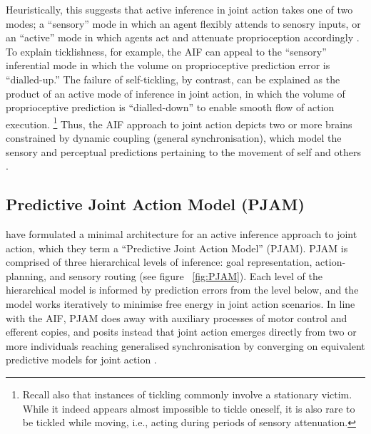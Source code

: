 \begin{CJK}{UTF8}{gbsn}
Heuristically, this suggests that active inference in joint action takes one of two modes; a ``sensory'' mode in which an agent flexibly attends to senosry inputs, or an ``active'' mode in which agents act and attenuate proprioception accordingly \citep{Friston2015}. To explain ticklishness, for example, the AIF can appeal to the ``sensory'' inferential mode in which the volume on proprioceptive prediction error is ``dialled-up.''  The failure of self-tickling, by contrast, can be explained as the product of an active mode of inference in joint action, in which the volume of proprioceptive prediction is ``dialled-down'' to enable smooth flow of action execution.
  \footnote{Recall also that instances of tickling commonly involve a stationary victim. While it indeed appears almost impossible to tickle oneself, it is also rare to be tickled while moving, i.e., acting during periods of sensory attenuation.}
Thus, the AIF approach to joint action depicts two or more brains constrained by dynamic coupling (general synchronisation), which model the sensory and perceptual predictions pertaining to the movement of self and others \citep{Pesquita2017}.


\subsection{Predictive Joint Action Model (PJAM)\label{sect:PJAM}}
 \textcite{Pesquita2017} have formulated a minimal architecture for an active inference approach to joint action, which they term a ``Predictive Joint Action Model'' (PJAM).  PJAM is comprised of three hierarchical levels of inference: goal representation, action-planning, and sensory routing (see figure ~\ref{fig:PJAM}).  Each level of the hierarchical model is informed by prediction errors from the level below, and the model works iteratively to minimise free energy in joint action scenarios.  In line with the AIF, PJAM does away with auxiliary processes of motor control and efferent copies, and posits instead that joint action emerges directly from two or more individuals reaching generalised synchronisation by converging on equivalent predictive models for joint action \citep{Friston2015}.


\end{CJK}

